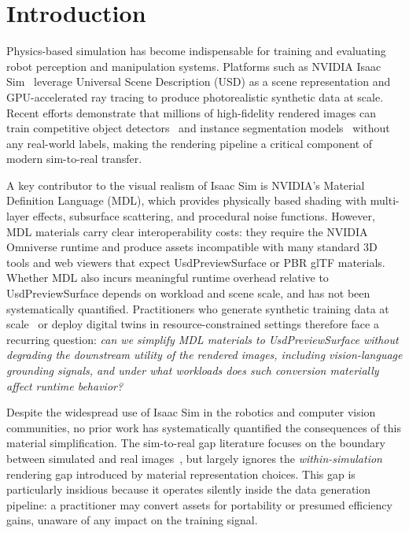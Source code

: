 \section{Introduction}
\label{sec:introduction}

Physics-based simulation has become indispensable for training and evaluating
robot perception and manipulation systems. Platforms such as NVIDIA Isaac
Sim~\cite{Mittal2025Isaac,Mittal2023Orbit,Makoviychuk2021Isaac} leverage
Universal Scene Description (USD) as a scene representation and GPU-accelerated
ray tracing to produce photorealistic synthetic data at scale. Recent efforts
demonstrate that millions of high-fidelity rendered images can train competitive
object detectors~\cite{Singh2025Synthetica} and instance segmentation
models~\cite{Ng2023SynTable} without any real-world labels, making the
rendering pipeline a critical component of modern sim-to-real transfer.

A key contributor to the visual realism of Isaac Sim is NVIDIA's Material
Definition Language (MDL), which provides physically based shading with
multi-layer effects, subsurface scattering, and procedural noise functions.
However, MDL materials carry clear interoperability costs: they require the
NVIDIA Omniverse runtime and produce assets incompatible with many standard 3D
tools and web viewers that expect UsdPreviewSurface or PBR glTF materials.
Whether MDL also incurs meaningful runtime overhead relative to
UsdPreviewSurface depends on workload and scene scale, and has not been
systematically quantified. Practitioners who generate synthetic training data
at scale~\cite{Singh2025Synthetica,Ng2023SynTable} or deploy digital twins in
resource-constrained settings therefore face a recurring question:
\emph{can we simplify MDL materials to UsdPreviewSurface without degrading the
downstream utility of the rendered images, including vision-language grounding
signals, and under what workloads does such conversion materially affect runtime
behavior?}

Despite the widespread use of Isaac Sim in the robotics and computer vision
communities, no prior work has systematically quantified the consequences of
this material simplification. The sim-to-real gap literature focuses on
the boundary between simulated and real images~\cite{Tobin2017Domain,Tremblay2018Training,Zakharov2022Photo}, but largely ignores the
\emph{within-simulation} rendering gap introduced by material representation
choices. This gap is particularly insidious because it operates silently inside
the data generation pipeline: a practitioner may convert assets for portability
or presumed efficiency gains, unaware of any impact on the training signal.

